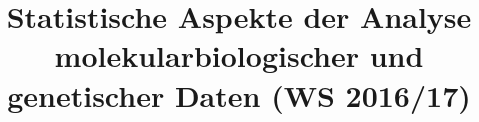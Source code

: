 \documentclass[12pt,a4paper]{article}
\title{\Huge\textbf{Statistische Aspekte der Analyse molekularbiologischer und genetischer Daten (WS 2016/17)}}
\author{}
\date{}
\begin{document}
\begin{titlepage}

\maketitle
\thispagestyle{empty}
\end{titlepage}
\newpage

\begin{titlepage}
\tableofcontents
\thispagestyle{empty}
\end{titlepage}
\newpage



\newpage



\newpage



\newpage



\newpage



\newpage



\newpage



\newpage



\newpage



\newpage



\newpage



\newpage



\newpage



\newpage


\end{document}
